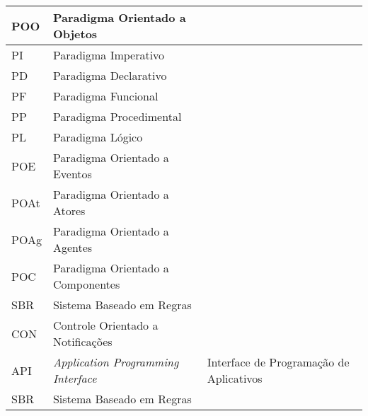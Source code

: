 \begin{table}[h!]
\begin{tabularx}{\textwidth}{l|X|X}
POO     & Paradigma Orientado a Objetos                                             &                                                    \\ \hline
PI      & Paradigma Imperativo                                                      &                                                    \\ \hline
PD      & Paradigma Declarativo                                                     &                                                    \\ \hline
PF      & Paradigma Funcional                                                       &                                                    \\ \hline
PP      & Paradigma Procedimental                                                   &                                                    \\ \hline
PL      & Paradigma Lógico                                                          &                                                    \\ \hline
POE     & Paradigma Orientado a Eventos                                             &                                                    \\ \hline
POAt    & Paradigma Orientado a Atores                                              &                                                    \\ \hline
POAg    & Paradigma Orientado a Agentes                                             &                                                    \\ \hline
POC     & Paradigma Orientado a Componentes                                         &                                                    \\ \hline
SBR     & Sistema Baseado em Regras                                                 &                                                    \\ \hline
CON     & Controle Orientado a Notificações                                         &                                                    \\ \hline
API     & \textit{Application Programming Interface}                                & Interface de Programação de Aplicativos            \\ \hline
SBR     & Sistema Baseado em Regras                                                 &                                                    \\ \hline

\end{tabularx}
\end{table}

